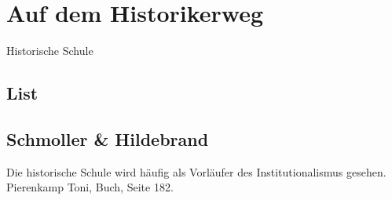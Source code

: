 %
%
%

\chapter{Auf dem Historikerweg}
\label{Historisch}
Historische Schule

\section{List}

\section{Schmoller \& Hildebrand}

Die historische Schule wird häufig als Vorläufer des Institutionalismus gesehen.
Pierenkamp Toni, Buch, Seite 182.